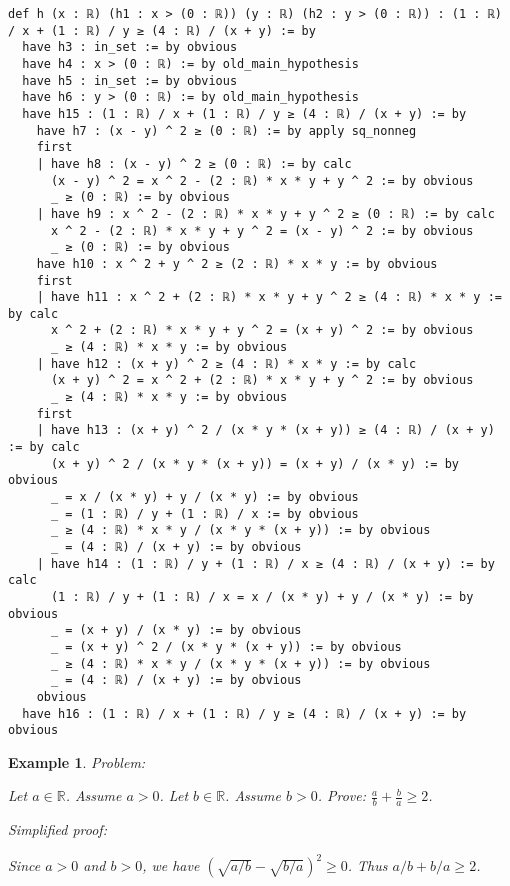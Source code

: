 \documentclass{article}
\newtheorem{example}{Example}
\begin{document}
\begin{tcolorbox}[colback=white!10, width=\linewidth]
\begin{lstlisting}[language=Lean4]
def h (x : ℝ) (h1 : x > (0 : ℝ)) (y : ℝ) (h2 : y > (0 : ℝ)) : (1 : ℝ) / x + (1 : ℝ) / y ≥ (4 : ℝ) / (x + y) := by
  have h3 : in_set := by obvious
  have h4 : x > (0 : ℝ) := by old_main_hypothesis
  have h5 : in_set := by obvious
  have h6 : y > (0 : ℝ) := by old_main_hypothesis
  have h15 : (1 : ℝ) / x + (1 : ℝ) / y ≥ (4 : ℝ) / (x + y) := by
    have h7 : (x - y) ^ 2 ≥ (0 : ℝ) := by apply sq_nonneg
    first
    | have h8 : (x - y) ^ 2 ≥ (0 : ℝ) := by calc
      (x - y) ^ 2 = x ^ 2 - (2 : ℝ) * x * y + y ^ 2 := by obvious
      _ ≥ (0 : ℝ) := by obvious
    | have h9 : x ^ 2 - (2 : ℝ) * x * y + y ^ 2 ≥ (0 : ℝ) := by calc
      x ^ 2 - (2 : ℝ) * x * y + y ^ 2 = (x - y) ^ 2 := by obvious
      _ ≥ (0 : ℝ) := by obvious
    have h10 : x ^ 2 + y ^ 2 ≥ (2 : ℝ) * x * y := by obvious
    first
    | have h11 : x ^ 2 + (2 : ℝ) * x * y + y ^ 2 ≥ (4 : ℝ) * x * y := by calc
      x ^ 2 + (2 : ℝ) * x * y + y ^ 2 = (x + y) ^ 2 := by obvious
      _ ≥ (4 : ℝ) * x * y := by obvious
    | have h12 : (x + y) ^ 2 ≥ (4 : ℝ) * x * y := by calc
      (x + y) ^ 2 = x ^ 2 + (2 : ℝ) * x * y + y ^ 2 := by obvious
      _ ≥ (4 : ℝ) * x * y := by obvious
    first
    | have h13 : (x + y) ^ 2 / (x * y * (x + y)) ≥ (4 : ℝ) / (x + y) := by calc
      (x + y) ^ 2 / (x * y * (x + y)) = (x + y) / (x * y) := by obvious
      _ = x / (x * y) + y / (x * y) := by obvious
      _ = (1 : ℝ) / y + (1 : ℝ) / x := by obvious
      _ ≥ (4 : ℝ) * x * y / (x * y * (x + y)) := by obvious
      _ = (4 : ℝ) / (x + y) := by obvious
    | have h14 : (1 : ℝ) / y + (1 : ℝ) / x ≥ (4 : ℝ) / (x + y) := by calc
      (1 : ℝ) / y + (1 : ℝ) / x = x / (x * y) + y / (x * y) := by obvious
      _ = (x + y) / (x * y) := by obvious
      _ = (x + y) ^ 2 / (x * y * (x + y)) := by obvious
      _ ≥ (4 : ℝ) * x * y / (x * y * (x + y)) := by obvious
      _ = (4 : ℝ) / (x + y) := by obvious
    obvious
  have h16 : (1 : ℝ) / x + (1 : ℝ) / y ≥ (4 : ℝ) / (x + y) := by obvious

\end{lstlisting}
\end{tcolorbox}


\begin{example}
Problem:
\begin{tcolorbox}[colback=yellow!10, width=\linewidth]
Let $a\in\mathbb{R}$. Assume $a > 0$.
    Let $b\in\mathbb{R}$. Assume $b > 0$.
    Prove: $\frac{a}{b} + \frac{b}{a} \ge 2$.
\end{tcolorbox}

Simplified proof:
\begin{tcolorbox}[colback=blue!10, width=\linewidth]
Since $a>0$ and $b>0$, we have $(\sqrt{a/b} - \sqrt{b/a})^2 \ge 0$. Thus $a/b + b/a \ge 2$.
\end{tcolorbox}
\end{example}
\end{document}
